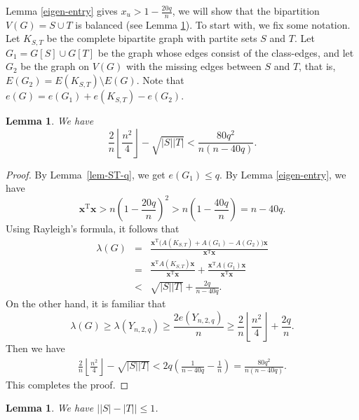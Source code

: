 \documentclass[11pt]{article}
\newtheorem{lemma}[theorem]{Lemma}
\begin{document}
Lemma \ref{eigen-entry} gives 
${x}_u > 1- \frac{20q}{n}$, 
we will show that the bipartition $V(G)=S\cup T$ is balanced 
(see Lemma \ref{balanced}). 
To start with, we fix some notation. 
Let $K_{S, T}$ be the complete bipartite graph with partite sets $S$ and $T$. Let $G_1 = G[S] \cup G[T]$ be 
the graph whose edges consist of the class-edges, 
and let $G_2$ be the graph on $V(G)$ with the missing edges between $S$ and $T$, that is,  $E(G_2)=E(K_{S,T}) \setminus E(G)$. Note that $e(G) = 
e(G_1) + e(K_{S,T})  - e(G_2)$.   


\begin{lemma} \label{over-square}
 We have 
\[  \frac{2}{n} \left \lfloor\frac{n^2}{4} \right \rfloor 
 - \sqrt{|S||T|}   < \frac{80q^2}{n(n- 40q)}. \]
\end{lemma}

\begin{proof} 
 By Lemma~\ref{lem-ST-q}, we get 
 $e(G_1) \leq q$. 
By Lemma \ref{eigen-entry}, we have 
\begin{equation*} \label{eqxx}
\bm{x}^{\mathrm{T}} \bm{x} >  
n \left(1-\frac{20q}{n} \right)^2 
> n \left(1-\frac{40q}{n} \right)=n- 40q.
\end{equation*} 
Using Rayleigh's formula, it follows  that 
 \begin{eqnarray*} 
 \lambda (G)
 &=& \frac{\bm{x}^{\mathrm{T}} \bigl( A(K_{S,T}) + 
 A(G_1) - A(G_2) \bigr)\bm{x}}{\bm{x}^{\mathrm{T}}\bm{x}} \\
  &=&  \frac{\bm{x}^{\mathrm{T}} A(K_{S,T})\bm{x}}{\bm{x}^{\mathrm{T}}\bm{x}}+ \frac{\bm{x}^{\mathrm{T}} A(G_1)\bm{x}}{\bm{x}^{\mathrm{T}}\bm{x}} \\
  &< &
   \sqrt{|S||T|} + \frac{2 q}{n-40q} .
 \end{eqnarray*}
 On the other hand,  it is familiar that 
 \[   \lambda (G)\ge \lambda (Y_{n,2,q}) \ge \frac{2e(Y_{n,2,q})}{n} 
 \ge  \frac{2}{n} \left \lfloor\frac{n^2}{4} \right \rfloor
 + \frac{ 2 q}{n}. \]
 Then we have 
 \begin{eqnarray*}
 \frac{2}{n} \left \lfloor\frac{n^2}{4} \right \rfloor 
  - \sqrt{|S||T|}  
<
    2q \left(\frac{1}{n- 40q }-\frac{1}{n}  \right) 
   = \frac{80q^2}{n(n-40q)}. 
 \end{eqnarray*}
 This completes the proof. 
 \end{proof}



\begin{lemma} \label{balanced}
We have $\bigl| |S| - |T| \bigr|\le 1$. 
\end{lemma}
\end{document}

